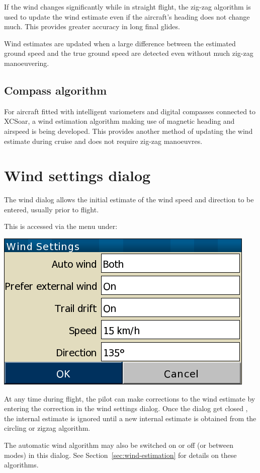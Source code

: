 If the wind changes significantly while in straight flight, the
zig-zag algorithm is used to update the wind estimate even if the
aircraft's heading does not change much. This provides greater
accuracy in long final glides.

Wind estimates are updated when a large difference between the
estimated ground speed and the true ground speed are detected even
without much zig-zag manoeuvering.

\subsection*{Compass algorithm}

For aircraft fitted with intelligent variometers and digital compasses
connected to XCSoar, a wind estimation algorithm making use of
magnetic heading and airspeed is being developed.  This provides
another method of updating the wind estimate during cruise and does
not require zig-zag manoeuvres.

\section{Wind settings dialog}\label{sec:wind-setup}

The wind dialog allows the initial estimate of the wind speed and
direction to be entered, usually prior to flight.

This is accessed via the menu under:
\begin{quote}
\blink{}
\end{quote}

\begin{center}
\includegraphics[angle=0,width=0.4\linewidth,keepaspectratio='true']{figures/dialog-wind2.png}
\end{center}

At any time during flight, the pilot can make corrections to the wind
estimate by entering the correction in the wind settings dialog.  Once the
dialog get closed , the internal estimate is ignored until a new internal
estimate is obtained from the circling or zigzag algorithm.

The automatic wind algorithm may also be switched on or off (or
between modes) in this dialog.  See Section~\ref{sec:wind-estimation}
for details on these algorithms.

